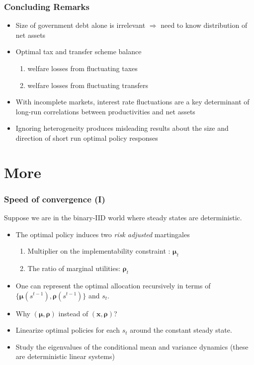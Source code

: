 \documentclass{beamer}
\begin{document}
\begin{frame}
 \frametitle{Concluding Remarks}
\begin{itemize}
\item Size of government debt alone is irrelevant $\Longrightarrow $
need to know   distribution of net assets
\item Optimal tax and transfer scheme balance
\begin{enumerate}
 \item welfare losses from fluctuating taxes
 \item welfare losses from fluctuating transfers
\end{enumerate}
\item With incomplete markets, interest rate fluctuations are a  key determinant of  long-run correlations between productivities and net assets
\item Ignoring heterogeneity produces misleading results about the size and direction of short run optimal policy responses
\end{itemize}

\end{frame}
\appendix
\section{More}

\begin{frame}[label=convergence]
\frametitle{Speed of convergence  (I) }
Suppose we are in the binary-IID world where steady states are deterministic.


\begin{itemize}
\item The optimal policy induces two \emph{risk adjusted} martingales
\begin{enumerate}
\item Multiplier on the implementability constraint : $\bm{\mu}_{t}$
\item The ratio of marginal utilities: $\bm{\rho}_{t}$
\end{enumerate}
 \item One can represent the optimal allocation recursively in terms of $\{\bm \mu(s^{t-1}),\bm \rho(s^{t-1})\}$ and $s_t$.
\item Why $(\bm{\mu},\bm{\rho})$ instead of $(\bm{x},\bm{\rho})$?
\item Linearize optimal policies for each $s_t$ around the constant steady state.
\item Study the eigenvalues of the conditional mean and variance dynamics (these are deterministic linear systems)
\end{itemize}

\end{frame}
\end{document}

